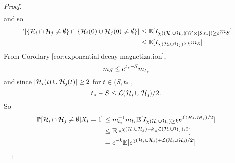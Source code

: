 \begin{proof}
\begin{align}
		\end{align}
		and so
		\begin{align}
			\mathbb{P}[\left\{\mathcal{H}_i \cap \mathcal{H}_j \neq \emptyset\right\} \cap \left\{\mathcal{H}_i(0) \cup \mathcal{H}_j(0) \neq \emptyset\right\}] &\leq \mathbb{E}[I_{\chi\left((\mathcal{H}_i \cup \mathcal{H}_j)\cap V \times [S, t_*]\right) \geq k  }m_S]\\
			&\leq \mathbb{E}[I_{\chi(\mathcal{H}_i \cup \mathcal{H}_j) \geq k } m_S].
		\end{align}
		From Corollary \ref{cor:exponential decay magnetization}, 
		\begin{equation}
			m_S \leq e^{t_* - S} m_{t_*}
		\end{equation}
		and since $|\mathcal{H}_i(t) \cup \mathcal{H}_j(t)| \geq 2$ for $t \in (S, t_*]$,
		\begin{equation}
			t_* - S \leq \mathcal{L}(\mathcal{H}_i \cup \mathcal{H}_j)/2.
		\end{equation}
		So
		\begin{align}
			\prob[\mathcal{H}_i \cap \mathcal{H}_j \neq \emptyset | X_i = 1] %
			&\leq m_{t_*}^{-1} m_{t_*} \expect[\indicator_{\chi(\hist_i \cup \hist_j) \geq k} \euler^{\mathcal{L}(\hist_i\cup \hist_j)/2}]\\
			&\leq \expect[\euler^{\chi(\hist_i\cup \hist_j) - k} \euler^{\mathcal{L}(\hist_i\cup \hist_j)/2}]\\
			&= \euler^{-k} \expect[\euler^{\chi(\hist_i\cup \hist_j) + \mathcal{L}(\hist_i\cup \hist_j)/2} ]
		\end{align}


\end{proof}
